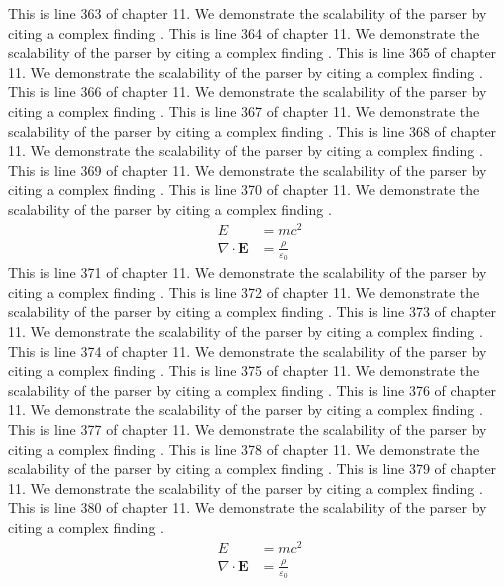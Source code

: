 This is line 363 of chapter 11. We demonstrate the scalability of the parser by citing a complex finding \cite{ref11_363}.
This is line 364 of chapter 11. We demonstrate the scalability of the parser by citing a complex finding \cite{ref11_364}.
This is line 365 of chapter 11. We demonstrate the scalability of the parser by citing a complex finding \cite{ref11_365}.
This is line 366 of chapter 11. We demonstrate the scalability of the parser by citing a complex finding \cite{ref11_366}.
This is line 367 of chapter 11. We demonstrate the scalability of the parser by citing a complex finding \cite{ref11_367}.
This is line 368 of chapter 11. We demonstrate the scalability of the parser by citing a complex finding \cite{ref11_368}.
This is line 369 of chapter 11. We demonstrate the scalability of the parser by citing a complex finding \cite{ref11_369}.
This is line 370 of chapter 11. We demonstrate the scalability of the parser by citing a complex finding \cite{ref11_370}.
\begin{align*}
  E &= mc^2 \\
  \nabla \cdot \mathbf{E} &= \frac{\rho}{\varepsilon_0}
\end{align*}
This is line 371 of chapter 11. We demonstrate the scalability of the parser by citing a complex finding \cite{ref11_371}.
This is line 372 of chapter 11. We demonstrate the scalability of the parser by citing a complex finding \cite{ref11_372}.
This is line 373 of chapter 11. We demonstrate the scalability of the parser by citing a complex finding \cite{ref11_373}.
This is line 374 of chapter 11. We demonstrate the scalability of the parser by citing a complex finding \cite{ref11_374}.
This is line 375 of chapter 11. We demonstrate the scalability of the parser by citing a complex finding \cite{ref11_375}.
This is line 376 of chapter 11. We demonstrate the scalability of the parser by citing a complex finding \cite{ref11_376}.
This is line 377 of chapter 11. We demonstrate the scalability of the parser by citing a complex finding \cite{ref11_377}.
This is line 378 of chapter 11. We demonstrate the scalability of the parser by citing a complex finding \cite{ref11_378}.
This is line 379 of chapter 11. We demonstrate the scalability of the parser by citing a complex finding \cite{ref11_379}.
This is line 380 of chapter 11. We demonstrate the scalability of the parser by citing a complex finding \cite{ref11_380}.
\begin{align*}
  E &= mc^2 \\
  \nabla \cdot \mathbf{E} &= \frac{\rho}{\varepsilon_0}
\end{align*}
